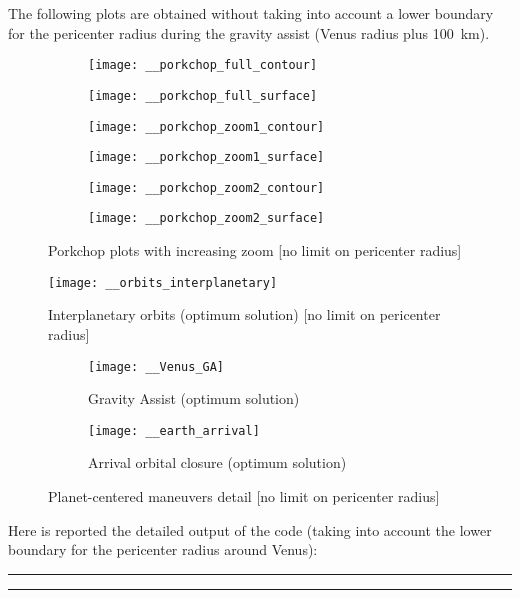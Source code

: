\clearpage
The following plots are obtained without taking into account a lower boundary for the pericenter radius during the gravity assist (Venus radius plus \SI{100}{km}).

\begin{figure}[htp]
	\begin{subfigure}{.5\textwidth}
		\centering
		\texttt{[image: \_\_porkchop\_full\_contour]}
	\end{subfigure}
	\begin{subfigure}{.5\textwidth}
		\centering
		\texttt{[image: \_\_porkchop\_full\_surface]}
	\end{subfigure}


	\begin{subfigure}{.5\textwidth}
		\centering
		\texttt{[image: \_\_porkchop\_zoom1\_contour]}
	\end{subfigure}
	\begin{subfigure}{.5\textwidth}
		\centering
		\texttt{[image: \_\_porkchop\_zoom1\_surface]}
	\end{subfigure}


	\begin{subfigure}{.5\textwidth}
		\centering
		\texttt{[image: \_\_porkchop\_zoom2\_contour]}
	\end{subfigure}
	\begin{subfigure}{.5\textwidth}
		\centering
		\texttt{[image: \_\_porkchop\_zoom2\_surface]}
	\end{subfigure}
	\caption{Porkchop plots with increasing zoom [no limit on pericenter radius]}
\end{figure}

\begin{figure}[htp]
\centering
\texttt{[image: \_\_orbits\_interplanetary]}
\caption{Interplanetary orbits (optimum solution) [no limit on pericenter radius]}
\end{figure}
\begin{figure}[htp]
\begin{subfigure}{.5\textwidth}
\centering
\texttt{[image: \_\_Venus\_GA]}
\caption{Gravity Assist (optimum solution)}
\end{subfigure}
\begin{subfigure}{.5\textwidth}
\centering
\texttt{[image: \_\_earth\_arrival]}
\caption{Arrival orbital closure (optimum solution)}
\end{subfigure}
\caption{Planet-centered maneuvers detail [no limit on pericenter radius]}
\end{figure}


\clearpage
Here is reported the detailed output of the code (taking into account the lower boundary for the pericenter radius around Venus):

\noindent\rule{8cm}{0.4pt}



\noindent\rule{8cm}{0.4pt}


\clearpage